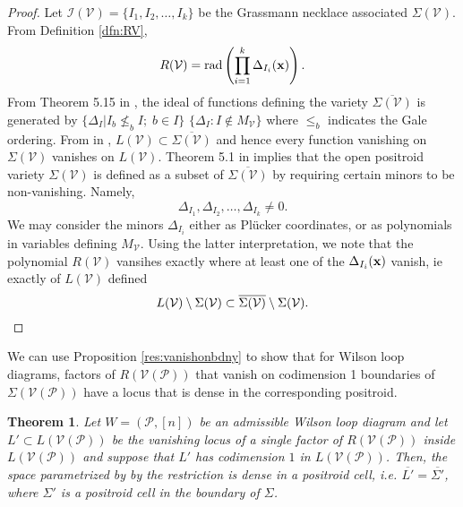 \documentclass[11pt]{article}
\newcommand{\sanote}{\todo[color=violet!30]}
\newcommand{\cP}{\mathcal{P}}
\newcommand{\cV}{\mathcal{V}}
\newcommand{\VP}{\cV(\cP)}
\newcommand{\cI}{\mathcal{I}}
\newtheorem{thm}{Theorem}[section]
\theoremstyle{remark}
\theoremstyle{definition}
\begin{document}
\begin{proof}
Let $\cI(\cV) = \{I_1, I_2, \dots, I_k\}$ be the Grassmann necklace associated $\Sigma(\cV)$. From Definition \ref{dfn:RV}, 
%
\begin{displaymath}
R(\cV) = \mathrm{rad}\left(\prod_{i = 1}^{k} \Delta_{I_i}(\bf{x})\right).
\end{displaymath}
%
From Theorem 5.15 in \cite{Juggling}, the ideal of functions defining the variety $\overline{\Sigma(\cV)}$ is generated by $\{\Delta_I | I_b \not \leq_b I; \; b \in I\}$ \st{$\{\Delta_I : I \notin M_{\cV}\}$} where $\leq_b$ indicates the Gale ordering. From in \cite[Theorem 5.1]{basisshapeloci}, $L(\cV) \subset \overline{\Sigma(\cV)}$ and hence every function vanishing on $\Sigma(\cV)$ vanishes on $L(\cV)$. Theorem 5.1 in \cite{Juggling} implies that the open positroid variety $\Sigma(\cV)$ is defined as a subset of $\overline{\Sigma(\cV)}$ by requiring certain minors to be non-vanishing. Namely, 
%
\begin{displaymath}
\Delta_{I_1}, \Delta_{I_2}, \dots, \Delta_{I_k} \neq 0.
\end{displaymath}
%
We may consider the minors $\Delta_{I_i}$ either as Pl\"{u}cker coordinates, or as polynomials in variables defining $M_{\cV}$. Using the latter interpretation, we note that the polynomial $R(\cV)$ vansihes exactly where at least one of the $\Delta_{I_i}(\bf{x})$ vanish, ie exactly  of $L(\cV)$ defined 
%
\begin{displaymath}
L(\cV) \setminus \Sigma(\cV) \subset \overline{\Sigma(\cV)} \setminus \Sigma(\cV). \qedhere
\end{displaymath}
\end{proof}

We can use Proposition \ref{res:vanishonbdny} to show that for Wilson loop diagrams, factors of $R(\VP)$ that vanish on codimension 1 boundaries of $\Sigma(\VP)$ have a locus that is dense in the corresponding positroid. \sanote{Cam, did I break this?}



\begin{thm}\label{res:polesonboundaries}
Let $W=(\mathcal{P},[n])$ be an admissible Wilson loop diagram and let $L' \subset L(\VP)$ be the vanishing locus of a single factor of $R(\VP)$ inside $L(\VP)$ and suppose that $L'$ has codimension $1$ in $L(\VP)$. Then, the space parametrized by by the restriction is dense in a positroid cell, i.e. $\overline{L'}= \overline{\Sigma'}$, where $\Sigma'$ is a positroid cell in the boundary of $\Sigma$. \end{thm}
\end{document}
